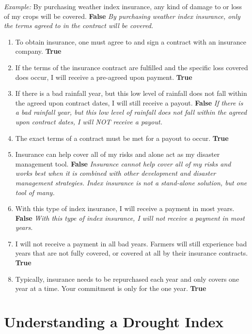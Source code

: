 \documentclass[letterpaper,10pt,english]{sphinxmanual}
\begin{document}
\emph{Example:} By purchasing weather index insurance, any kind of damage to or loss of my crops will be covered. \textbf{False} \emph{By purchasing weather index insurance, only the terms agreed to in the contract will be covered.}
\begin{enumerate}
\item {} 
To obtain insurance, one must agree to and sign a contract with an insurance company. \textbf{True}

\item {} 
If the terms of the insurance contract are fulfilled and the specific loss covered does occur, I will receive a pre-agreed upon payment. \textbf{True}

\item {} 
If there is a bad rainfall year, but this low level of rainfall does not fall within the agreed upon contract dates, I will still receive a payout. \textbf{False} \emph{If there is a bad rainfall year, but this low level of rainfall does not fall within the agreed upon contract dates, I will NOT receive a payout.}

\item {} 
The exact terms of a contract must be met for a payout to occur. \textbf{True}

\item {} 
Insurance can help cover all of my risks and alone act as my disaster management tool. \textbf{False} \emph{Insurance cannot help cover all of my risks and works best when it is combined with other development and disaster management strategies. Index insurance is not a stand-alone solution, but one tool of many.}

\item {} 
With this type of index insurance, I will receive a payment in most years. \textbf{False} \emph{With this type of index insurance, I will not receive a payment in most years.}

\item {} 
I will not receive a payment in all bad years. Farmers will still experience bad years that are not fully covered, or covered at all by their insurance contracts. \textbf{True}

\item {} 
Typically, insurance needs to be repurchased each year and only covers one year at a time. Your commitment is only for the one year. \textbf{True}

\end{enumerate}


\section{Understanding a Drought Index}
\label{whatisindexinsurance/understandingadroughtindex_en_Web:understanding-a-drought-index}\label{whatisindexinsurance/understandingadroughtindex_en_Web::doc}
\end{document}

